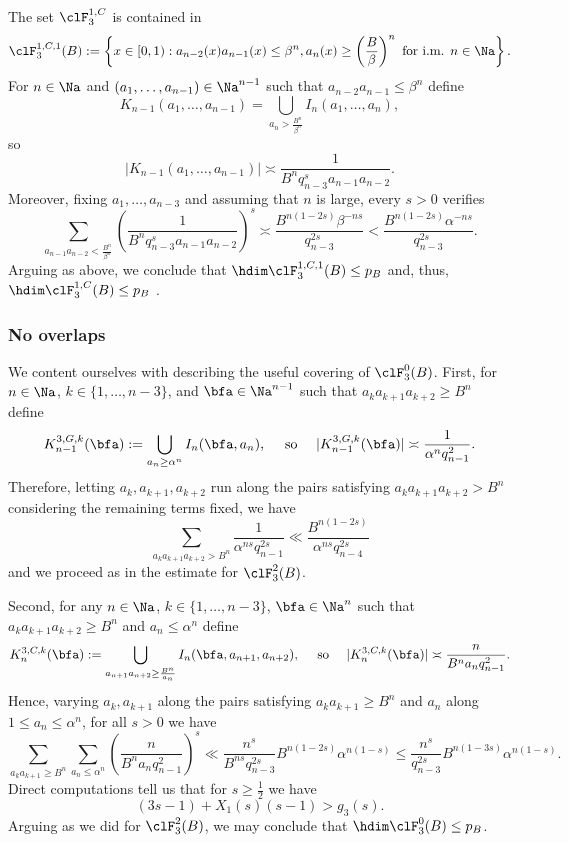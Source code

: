 \documentclass[12pt,a4paper]{amsart}
\begin{document}
The set $\clF_3^{1,C}$ is contained in
\[
\clF_{3}^{1,C,1}(B)
:=
\left\{x\in [0,1): a_{n-2}(x) a_{n-1}(x) \leq \beta^n, a_{n}(x) \geq \left(\frac{B}{\beta}\right)^n \text{ for i.m.   }n\in\Na\right\}.
\]
For $n\in\Na$ and $(a_{1},\ldots,a_{n-1})\in\Na^{n-1}$ such that $a_{n-2}a_{n-1}\leq \beta^n$ define 
\[
K_{n-1}(a_1,\ldots, a_{n-1})
=
\bigcup_{a_n> \frac{B^n}{\beta^n}} I_n(a_1,\ldots, a_n),
\]
so
\[
|K_{n-1}(a_1,\ldots, a_{n-1})|
\asymp
\frac{1}{B^nq_{n-3}^s a_{n-1}a_{n-2}}.
\]
Moreover, fixing $a_1,\ldots, a_{n-3}$ and assuming that $n$ is large, every $s>0$ verifies
\[
\sum_{a_{n-1}a_{n-2}< \frac{B^n}{\beta^n}}
\left(\frac{1}{B^nq_{n-3}^s a_{n-1}a_{n-2}}\right)^s
\asymp
\frac{B^{n(1-2s)}\beta^{-ns}}{q_{n-3}^{2s}}
<
\frac{B^{n(1-2s)}\alpha^{-ns}}{q_{n-3}^{2s}}.
\]
Arguing as above, we conclude that $\hdim \clF_{3}^{1,C,1}(B)\leq p_B$ and, thus, $\hdim \clF_{3}^{1,C}(B)\leq p_B$ .


\subsubsection{No overlaps}
We content ourselves with describing the useful covering of $\clF_3^{0}(B)$. First, for $n\in\Na$, $k\in \{1,\ldots, n-3\}$, and $\bfa\in\Na^{n-1}$ such that $a_{k}a_{k+1}a_{k+2}\geq B^n$ define 
\[
K_{n-1}^{3,G,k}(\bfa)
:=
\bigcup_{a_n\geq \alpha^n} I_n(\bfa, a_n), 
\quad\text{ so }\quad
|K_{n-1}^{3,G,k}(\bfa)|
\asymp 
\frac{1}{\alpha^n q_{n-1}^2}.
\]
Therefore, letting $a_k,a_{k+1},a_{k+2}$ run along the pairs satisfying $a_ka_{k+1}a_{k+2}>B^n$ considering the remaining terms fixed, we have
\[
\sum_{a_ka_{k+1}a_{k+2}>B^n} 
\frac{1}{\alpha^{ns} q_{n-1}^{2s}}
\ll
\frac{B^{n(1-2s)}}{\alpha^{ns} q_{n-4}^{2s}}
\]
and we proceed as in the estimate for $\clF_3^2(B)$.


Second, for any $n\in\Na$, $k\in \{1,\ldots, n-3\}$, $\bfa\in\Na^n$ such that $a_{k}a_{k+1}a_{k+2}\geq B^n$ and $a_n\leq \alpha^n$ define 
\[
K_n^{3,C,k}(\bfa)
:=
\bigcup_{a_{n+1}a_{n+2}\geq \frac{B^n}{a_n}} I_n(\bfa, a_{n+1}, a_{n+ 2}), 
\quad\text{ so }\quad
|K_n^{3,C,k}(\bfa)|
\asymp 
\frac{n}{B^na_nq_{n-1}^2}.
\]
Hence, varying $a_k,a_{k+1}$ along the pairs satisfying $a_ka_{k+1}\geq B^n$ and $a_n$ along $1\leq a_n\leq \alpha^n$, for all $s>0$ we have 
\[
\sum_{a_ka_{k+1}\geq B^n}
\sum_{a_n\leq \alpha^n}
\left(\frac{n}{B^na_nq_{n-1}^2}\right)^s
\ll
\frac{n^s}{B^{ns}q_{n-3}^{2s}}B^{n(1-2s)}\alpha^{n(1-s)}
\leq
\frac{n^s}{q_{n-3}^{2s}}B^{n(1-3s)}\alpha^{n(1-s)}.
\]
Direct computations tell us that for $s\geq \frac{1}{2}$ we have
\[
(3s-1)+X_1(s)(s-1)>g_3(s).
\]
Arguing as we did for $\clF_3^2(B)$, we may conclude that $\hdim \clF_3^0(B)\leq p_B$.
\end{document}
